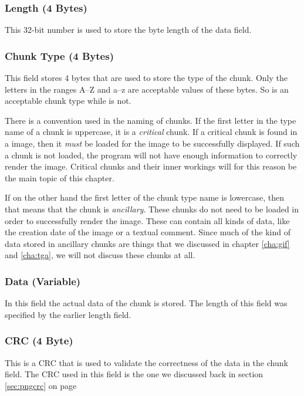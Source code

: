 \subsubsection*{Length (4 Bytes)}

This 32-bit number is used to store the byte length of the data
field.

\subsubsection*{Chunk Type (4 Bytes)}

This field stores 4 bytes that are used to store the type of the
chunk. Only the \ascii letters in the ranges A--Z and a--z are
acceptable values of these bytes. So  is an acceptable
chunk type while  is not.

There is a convention used in the naming of chunks. If the first
letter in the type name of a chunk is uppercase, it is a
\textit{critical} chunk. If a critical chunk is found in a \png image,
then it \textit{must} be loaded for the image to be successfully
displayed.  If such a chunk is not loaded, the program will not have
enough information to correctly render the image. Critical chunks and
their inner workings will for this reason be the main topic of this
chapter.

If on the other hand the first letter of the chunk type name is
lowercase, then that means that the chunk is \textit{ancillary}. These
chunks do not need to be loaded in order to successfully render the
image. These can contain all kinds of data, like the creation date of
the image or a textual comment. Since much of the kind of data stored
in ancillary chunks are things that we discussed in chapter
\ref{cha:gif} and \ref{cha:tga}, we will not discuss these chunks at
all.

\subsubsection*{Data (Variable)}

In this field the actual data of the chunk is stored. The length of
this field was specified by the earlier length field.

\subsubsection*{CRC (4 Byte)}

This is a CRC that is used to validate the correctness of the data in
the chunk field. The CRC used in this field is the one we discussed
back in section \ref{sec:pngcrc} on page \pageref{sec:pngcrc}

